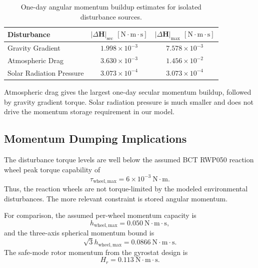 \begin{table}[H]
    \centering
    \caption{One-day angular momentum buildup estimates for isolated disturbance sources.}
    \label{tab:deltaH_day}
    \begin{tabular}{lcc}
        \hline
        \textbf{Disturbance} &
        \textbf{$|\Delta \mathbf{H}|_{\mathrm{sec}}$ $[\mathrm{N\cdot m\cdot s}]$} &
        \textbf{$|\Delta \mathbf{H}|_{\max}$ $[\mathrm{N\cdot m\cdot s}]$} \\
        \hline
        Gravity Gradient & $1.998\times10^{-3}$ & $7.578\times10^{-3}$ \\
        Atmospheric Drag & $3.630\times10^{-3}$ & $1.456\times10^{-2}$ \\
        Solar Radiation Pressure & $3.073\times10^{-4}$ & $3.073\times10^{-4}$ \\
        \hline
    \end{tabular}
\end{table}

Atmospheric drag gives the largest one-day secular momentum buildup, followed by gravity
gradient torque. Solar radiation pressure is much smaller and does not drive the momentum
storage requirement in our model.

\subsection{Momentum Dumping Implications}
\label{sec:momentum_dumping}

The disturbance torque levels are well below the assumed BCT RWP050 reaction wheel peak
torque capability of
\begin{equation}
    \tau_{\mathrm{wheel,max}} = 6\times10^{-3}~\mathrm{N\cdot m}.
\end{equation}
Thus, the reaction wheels are not torque-limited by the modeled environmental disturbances.
The more relevant constraint is stored angular momentum.

For comparison, the assumed per-wheel momentum capacity is
\begin{equation}
    h_{\mathrm{wheel,max}} = 0.050~\mathrm{N\cdot m\cdot s},
\end{equation}
and the three-axis spherical momentum bound is
\begin{equation}
    \sqrt{3}h_{\mathrm{wheel,max}} = 0.0866~\mathrm{N\cdot m\cdot s}.
\end{equation}
The safe-mode rotor momentum from the gyrostat design is
\begin{equation}
    H_r = 0.113~\mathrm{N\cdot m\cdot s}.
\end{equation}


